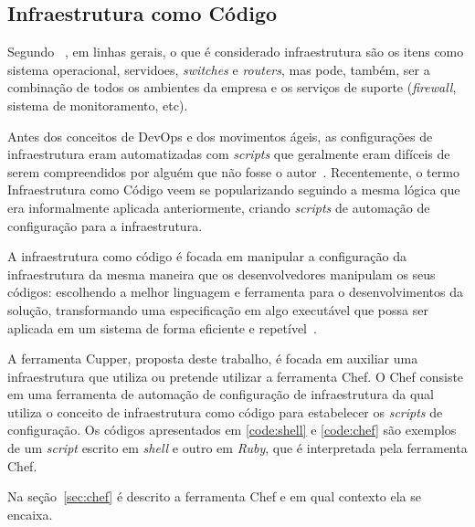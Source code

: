 \subsection{Infraestrutura como Código}


Segundo ~, em linhas gerais, o que é considerado
infraestrutura são os itens como sistema operacional, servidoes,
\textit{switches} e \textit{routers}, mas pode, também, ser a combinação
de todos os ambientes da empresa e os serviços de suporte (\textit{firewall},
sistema de monitoramento, etc).

Antes dos conceitos de DevOps e dos movimentos ágeis, as configurações de
infraestrutura eram automatizadas com \textit{scripts} que geralmente eram
difíceis de serem compreendidos por alguém que não fosse o autor~\cite{huttermann:2012}.
Recentemente, o termo Infraestrutura como Código veem se popularizando
seguindo a mesma lógica que era informalmente aplicada anteriormente, criando
\textit{scripts} de automação de configuração para a infraestrutura.

A infraestrutura como código é focada em manipular a configuração da infraestrutura
da mesma maneira que os desenvolvedores manipulam os seus códigos: escolhendo a melhor
linguagem e ferramenta para o desenvolvimentos da solução, transformando uma especificação
em algo executável que possa ser aplicada em um sistema de forma eficiente e
repetível~\cite{huttermann:2012}. \\

\noindent\begin{minipage}{.45\textwidth}
  \label{code:shell}
  \lstset{style=shell}
  
\end{minipage}\hfill
\begin{minipage}{.45\textwidth}
  \label{code:chef}
  \lstset{style=shell}
  
\end{minipage}


A ferramenta Cupper, proposta deste trabalho, é focada em auxiliar uma infraestrutura que
utiliza ou pretende utilizar a ferramenta Chef. O Chef consiste em uma ferramenta de
automação de configuração de infraestrutura da qual utiliza o conceito de infraestrutura
como código para estabelecer os \textit{scripts} de configuração. Os códigos apresentados em \ref{code:shell} e
\ref{code:chef} são exemplos de um \textit{script} escrito em \textit{shell} e outro em \textit{Ruby}, que é
interpretada pela ferramenta Chef.

Na seção~\ref{sec:chef} é descrito a ferramenta Chef e em qual contexto
ela se encaixa.
